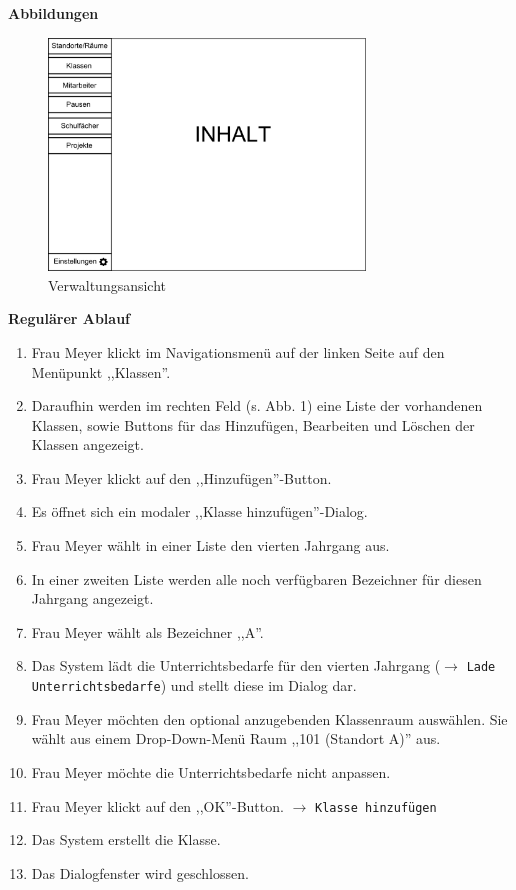 \documentclass[fontsize=12pt,paper=a4,twoside]{scrartcl}
\begin{document}
\textbf{Abbildungen}
\begin{figure}[H]
\caption{Verwaltungsansicht}
\includegraphics[width=0.75\textwidth]{mainpage_idea.png}
\end{figure}
\vspace{5pt}


\textbf{Regulärer Ablauf}
\begin{enumerate}
\item Frau Meyer klickt im Navigationsmenü auf der linken Seite auf den Menüpunkt ,,Klassen''.
\item Daraufhin werden im rechten Feld (s. Abb. 1) eine Liste der vorhandenen Klassen, sowie Buttons für das Hinzufügen, Bearbeiten und Löschen der Klassen angezeigt.
\item Frau Meyer klickt auf den ,,Hinzufügen''-Button.
\item Es öffnet sich ein modaler ,,Klasse hinzufügen''-Dialog.
\item Frau Meyer wählt in einer Liste den vierten Jahrgang aus. 
\item In einer zweiten Liste werden alle noch verfügbaren Bezeichner für diesen Jahrgang angezeigt.
\item Frau Meyer wählt als Bezeichner ,,A''.
\item Das System lädt die  Unterrichtsbedarfe für den vierten Jahrgang ($\rightarrow$ \texttt{Lade Unterrichtsbedarfe}) und stellt diese im Dialog dar.
\item Frau Meyer möchten den optional anzugebenden Klassenraum auswählen. Sie wählt aus einem Drop-Down-Menü Raum ,,101 (Standort A)'' aus.
\item Frau Meyer möchte die Unterrichtsbedarfe nicht anpassen.
\item Frau Meyer klickt auf den ,,OK''-Button. $\rightarrow$ \texttt{Klasse hinzufügen}
\item Das System erstellt die Klasse. 
\item Das Dialogfenster wird geschlossen.
\end{enumerate}
\vspace{5pt}
\end{document}
